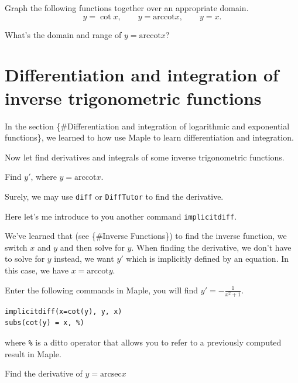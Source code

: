 \documentclass[]{book}
\theoremstyle{definition}
\theoremstyle{definition}
\theoremstyle{definition}
\theoremstyle{remark}
\let\BeginKnitrBlock\begin \let\EndKnitrBlock\end
\begin{document}
\BeginKnitrBlock{exercise}
\protect\hypertarget{exr:unnamed-chunk-3}{}{\label{exr:unnamed-chunk-3} }
Graph the following functions together over an appropriate domain.
\[
y=\cot x, \qquad y=\mathrm{arccot} x, \qquad y=x.
\]

What's the domain and range of \(y=\mathrm{arccot} x\)?
\EndKnitrBlock{exercise}

\hypertarget{differentiation-and-integration-of-inverse-trigonometric-functions}{%
\section{Differentiation and integration of inverse trigonometric functions}\label{differentiation-and-integration-of-inverse-trigonometric-functions}}

In the section \{\#Differentiation and integration of logarithmic and exponential functions\}, we learned to how use Maple to learn differentiation and integration.

Now let find derivatives and integrals of some inverse trigonometric functions.

\BeginKnitrBlock{example}
\protect\hypertarget{exm:unnamed-chunk-4}{}{\label{exm:unnamed-chunk-4} }
Find \(y'\), where \(y=\mathrm{arccot} x\).
\EndKnitrBlock{example}

\BeginKnitrBlock{solution}
{}

Surely, we may use \texttt{diff} or \texttt{DiffTutor} to find the derivative.

Here let's me introduce to you another command \texttt{implicitdiff}.

We've learned that (see \{\#Inverse Functions\}) to find the inverse function, we switch \(x\) and \(y\) and then solve for \(y\). When finding the derivative, we don't have to solve for \(y\) instead, we want \(y'\) which is implicitly defined by an equation. In this case, we have \(x=\mathrm{arccot}y\).

Enter the following commands in Maple, you will find \(y'=-\frac{1}{x^2+1}\).

\begin{verbatim}
implicitdiff(x=cot(y), y, x)
subs(cot(y) = x, %)
\end{verbatim}

where \texttt{\%} is a ditto operator that allows you to refer to a previously computed result in Maple.
\EndKnitrBlock{solution}

\BeginKnitrBlock{exercise}
\protect\hypertarget{exr:unnamed-chunk-6}{}{\label{exr:unnamed-chunk-6} }
Find the derivative of \(y=\mathrm{arcsec} x\)
\EndKnitrBlock{exercise}
\end{document}

